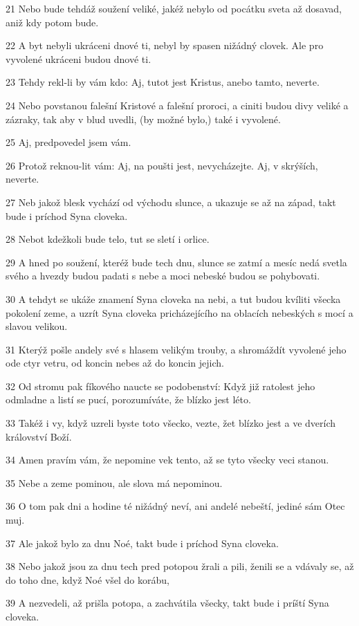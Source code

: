 \par 21 Nebo bude tehdáž soužení veliké, jakéž nebylo od pocátku sveta až dosavad, aniž kdy potom bude.
\par 22 A byt nebyli ukráceni dnové ti, nebyl by spasen nižádný clovek. Ale pro vyvolené ukráceni budou dnové ti.
\par 23 Tehdy rekl-li by vám kdo: Aj, tutot jest Kristus, anebo tamto, neverte.
\par 24 Nebo povstanou falešní Kristové a falešní proroci, a ciniti budou divy veliké a zázraky, tak aby v blud uvedli, (by možné bylo,) také i vyvolené.
\par 25 Aj, predpovedel jsem vám.
\par 26 Protož reknou-lit vám: Aj, na poušti jest, nevycházejte. Aj, v skrýších, neverte.
\par 27 Neb jakož blesk vychází od východu slunce, a ukazuje se až na západ, takt bude i príchod Syna cloveka.
\par 28 Nebot kdežkoli bude telo, tut se sletí i orlice.
\par 29 A hned po soužení, kteréž bude tech dnu, slunce se zatmí a mesíc nedá svetla svého a hvezdy budou padati s nebe a moci nebeské budou se pohybovati.
\par 30 A tehdyt se ukáže znamení Syna cloveka na nebi, a tut budou kvíliti všecka pokolení zeme, a uzrít Syna cloveka pricházejícího na oblacích nebeských s mocí a slavou velikou.
\par 31 Kterýž pošle andely své s hlasem velikým trouby, a shromáždít vyvolené jeho ode ctyr vetru, od koncin nebes až do koncin jejich.
\par 32 Od stromu pak fíkového naucte se podobenství: Když již ratolest jeho odmladne a listí se pucí, porozumíváte, že blízko jest léto.
\par 33 Takéž i vy, když uzreli byste toto všecko, vezte, žet blízko jest a ve dverích království Boží.
\par 34 Amen pravím vám, že nepomine vek tento, až se tyto všecky veci stanou.
\par 35 Nebe a zeme pominou, ale slova má nepominou.
\par 36 O tom pak dni a hodine té nižádný neví, ani andelé nebeští, jediné sám Otec muj.
\par 37 Ale jakož bylo za dnu Noé, takt bude i príchod Syna cloveka.
\par 38 Nebo jakož jsou za dnu tech pred potopou žrali a pili, ženili se a vdávaly se, až do toho dne, když Noé všel do korábu,
\par 39 A nezvedeli, až prišla potopa, a zachvátila všecky, takt bude i príští Syna cloveka.
